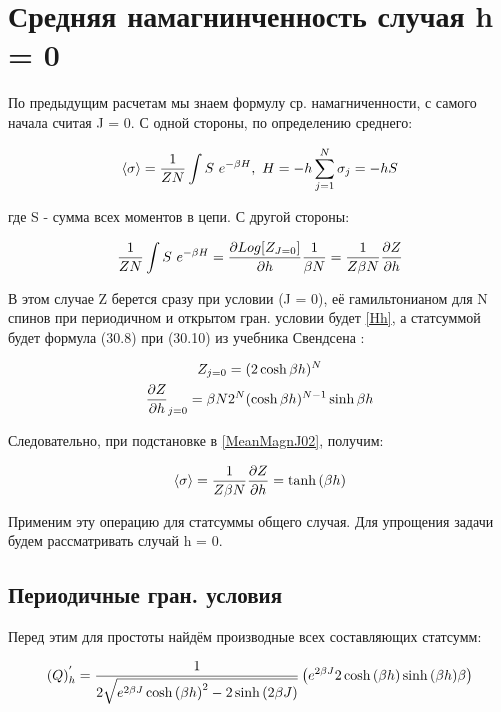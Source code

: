 \section{Средняя намагнинченность случая h = 0}

По предыдущим расчетам мы знаем формулу ср. намагниченности, с самого начала считая J = 0. С одной стороны, по определению среднего:

\begin{equation}\label{MeanMagnJ01}
    \langle\sigma\rangle = \frac{1}{ZN} \int S\ e^{-\beta H},\  H = -h\sum_{j=1}^{N}\sigma_{j} = -h S
\end{equation}

где S - сумма всех моментов в цепи. С другой стороны: 

\begin{equation}\label{MeanMagnJ02}
    \frac{1}{ZN} \int S\ e^{-\beta H} = \frac{\partial Log[Z_{J = 0}]}{\partial h} \frac{1}{\beta N} = \frac{1}{Z \beta N}  \frac{\partial Z}{\partial h}
\end{equation}

В этом случае Z берется сразу при условии (J = 0), её гамильтонианом для N спинов при периодичном и открытом гран. условии будет \eqref{Hh}, а статсуммой будет формула (30.8) при (30.10) из учебника Свендсена \cite{Swen}:

\begin{gather}
    \label{Zh0} Z_{j = 0} = (2\cosh{\beta h})^N \\
    \label{Z'hh0} \frac{\partial Z}{\partial h}_{j = 0} = \beta N 2^{N}(\cosh{\beta h})^{N-1}\sinh{\beta h}
\end{gather}

Следовательно, при подстановке в \eqref{MeanMagnJ02}, получим:

\begin{equation}\label{MeanMagnJ0Final}
    \langle\sigma\rangle = \frac{1}{Z \beta N}  \frac{\partial Z}{\partial h} = \tanh{(\beta h)}  
\end{equation}

Применим эту операцию для статсуммы общего случая.
Для упрощения задачи будем рассматривать случай h = 0.

\subsection{Периодичные гран. условия}

Перед этим для простоты найдём производные всех составляющих статсумм:

\begin{equation}\label{Q'h}
    (Q)^{'}_{h} = \frac{1}{2\sqrt{e^{2\beta J} \cosh{(\beta h)}^{2} - 2 \sinh{(2\beta J)}}}  \left( e^{2\beta J}2\cosh{(\beta h)} \sinh{(\beta h)}  \beta\right)
\end{equation}

